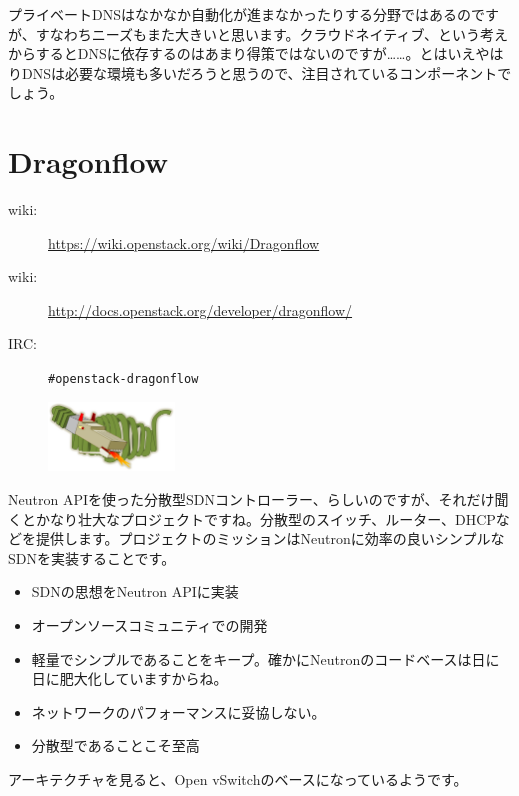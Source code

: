 プライベートDNSはなかなか自動化が進まなかったりする分野ではあるのですが、すなわちニーズもまた大きいと思います。クラウドネイティブ、という考えからするとDNSに依存するのはあまり得策ではないのですが……。とはいえやはりDNSは必要な環境も多いだろうと思うので、注目されているコンポーネントでしょう。

\section{Dragonflow}

\begin{description}
	\item[wiki:] \url{https://wiki.openstack.org/wiki/Dragonflow}
	\item[wiki:] \url{http://docs.openstack.org/developer/dragonflow/}
	\item[IRC:] \verb|#openstack-dragonflow|
\end{description}

\begin{figure}
	\begin{center}
		\includegraphics[width=0.3\textwidth]{img/Df_logo.png}
	\end{center}
\end{figure}

Neutron APIを使った分散型SDNコントローラー、らしいのですが、それだけ聞くとかなり壮大なプロジェクトですね。分散型のスイッチ、ルーター、DHCPなどを提供します。プロジェクトのミッションはNeutronに効率の良いシンプルなSDNを実装することです。

\begin{itemize}
	\item SDNの思想をNeutron APIに実装
	\item オープンソースコミュニティでの開発
	\item 軽量でシンプルであることをキープ。確かにNeutronのコードベースは日に日に肥大化していますからね。
	\item ネットワークのパフォーマンスに妥協しない。
	\item 分散型であることこそ至高
\end{itemize}

アーキテクチャを見ると、Open vSwitchのベースになっているようです。

